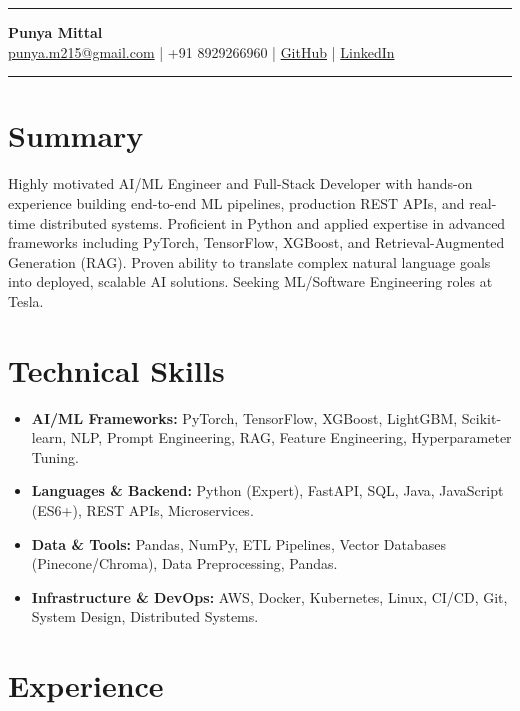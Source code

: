 \documentclass[10pt, a4paper]{article}
\makeatletter
\newcommand{\contactinfo}[1]{
    \centering
    \vspace{-10pt}
    \hrule
    \vspace{2pt}
    \textbf{\Large #1} \\
    \small \href{mailto:punya.m215@gmail.com}{punya.m215@gmail.com} | +91 8929266960 | 
    \href{https://github.com/yourusername}{GitHub} | \href{https://linkedin.com/in/yourprofile}{LinkedIn}
    \vspace{4pt}
    \hrule
}
\makeatother
\begin{document}
\contactinfo{Punya Mittal}

\section*{Summary}
Highly motivated AI/ML Engineer and Full-Stack Developer with hands-on experience building end-to-end ML pipelines, production REST APIs, and real-time distributed systems. Proficient in Python and applied expertise in advanced frameworks including PyTorch, TensorFlow, XGBoost, and Retrieval-Augmented Generation (RAG). Proven ability to translate complex natural language goals into deployed, scalable AI solutions. Seeking ML/Software Engineering roles at Tesla.

\section*{Technical Skills}
\begin{itemize}[leftmargin=*, itemsep=1pt, parsep=0pt]
    \item \textbf{AI/ML Frameworks:} PyTorch, TensorFlow, XGBoost, LightGBM, Scikit-learn, NLP, Prompt Engineering, RAG, Feature Engineering, Hyperparameter Tuning.
    \item \textbf{Languages \& Backend:} Python (Expert), FastAPI, SQL, Java, JavaScript (ES6+), REST APIs, Microservices.
    \item \textbf{Data \& Tools:} Pandas, NumPy, ETL Pipelines, Vector Databases (Pinecone/Chroma), Data Preprocessing, Pandas.
    \item \textbf{Infrastructure \& DevOps:} AWS, Docker, Kubernetes, Linux, CI/CD, Git, System Design, Distributed Systems.
\end{itemize}

\section*{Experience}
\end{document}
